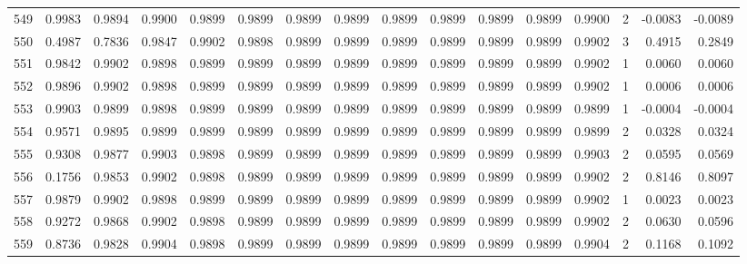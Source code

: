 \begin{tabular}{lrrrrrrrrrrrrrrr}
549 &      0.9983 &  0.9894 &  0.9900 &  0.9899 &  0.9899 &  0.9899 &  0.9899 &  0.9899 &  0.9899 &  0.9899 &   0.9899 &     0.9900 &      2 &                   -0.0083 &                    -0.0089 \\
550 &      0.4987 &  0.7836 &  0.9847 &  0.9902 &  0.9898 &  0.9899 &  0.9899 &  0.9899 &  0.9899 &  0.9899 &   0.9899 &     0.9902 &      3 &                    0.4915 &                     0.2849 \\
551 &      0.9842 &  0.9902 &  0.9898 &  0.9899 &  0.9899 &  0.9899 &  0.9899 &  0.9899 &  0.9899 &  0.9899 &   0.9899 &     0.9902 &      1 &                    0.0060 &                     0.0060 \\
552 &      0.9896 &  0.9902 &  0.9898 &  0.9899 &  0.9899 &  0.9899 &  0.9899 &  0.9899 &  0.9899 &  0.9899 &   0.9899 &     0.9902 &      1 &                    0.0006 &                     0.0006 \\
553 &      0.9903 &  0.9899 &  0.9898 &  0.9899 &  0.9899 &  0.9899 &  0.9899 &  0.9899 &  0.9899 &  0.9899 &   0.9899 &     0.9899 &      1 &                   -0.0004 &                    -0.0004 \\
554 &      0.9571 &  0.9895 &  0.9899 &  0.9899 &  0.9899 &  0.9899 &  0.9899 &  0.9899 &  0.9899 &  0.9899 &   0.9899 &     0.9899 &      2 &                    0.0328 &                     0.0324 \\
555 &      0.9308 &  0.9877 &  0.9903 &  0.9898 &  0.9899 &  0.9899 &  0.9899 &  0.9899 &  0.9899 &  0.9899 &   0.9899 &     0.9903 &      2 &                    0.0595 &                     0.0569 \\
556 &      0.1756 &  0.9853 &  0.9902 &  0.9898 &  0.9899 &  0.9899 &  0.9899 &  0.9899 &  0.9899 &  0.9899 &   0.9899 &     0.9902 &      2 &                    0.8146 &                     0.8097 \\
557 &      0.9879 &  0.9902 &  0.9898 &  0.9899 &  0.9899 &  0.9899 &  0.9899 &  0.9899 &  0.9899 &  0.9899 &   0.9899 &     0.9902 &      1 &                    0.0023 &                     0.0023 \\
558 &      0.9272 &  0.9868 &  0.9902 &  0.9898 &  0.9899 &  0.9899 &  0.9899 &  0.9899 &  0.9899 &  0.9899 &   0.9899 &     0.9902 &      2 &                    0.0630 &                     0.0596 \\
559 &      0.8736 &  0.9828 &  0.9904 &  0.9898 &  0.9899 &  0.9899 &  0.9899 &  0.9899 &  0.9899 &  0.9899 &   0.9899 &     0.9904 &      2 &                    0.1168 &                     0.1092 \\

\end{tabular}
